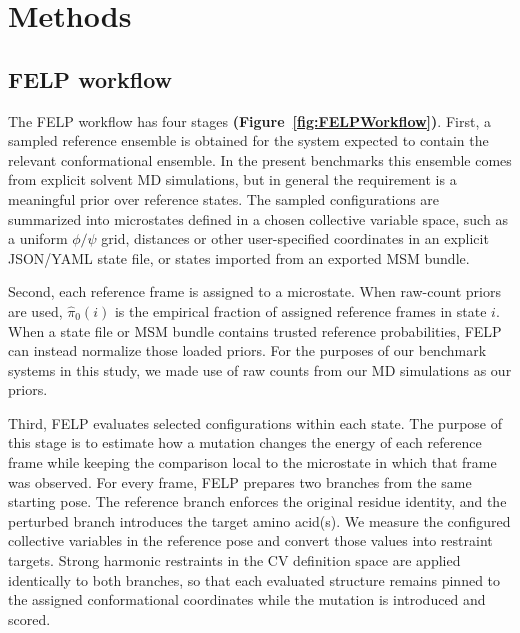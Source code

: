 \documentclass[journal=jctcce,manuscript=article,layout=twocolumn,hyperref=true]{achemso}
\newcommand{\figrefp}[2][]{\textbf{(Figure~\ref{#2}#1)}}
\begin{document}
	\section{Methods}
	
	\subsection{FELP workflow}
	
	The FELP workflow has four stages \figrefp{fig:FELPWorkflow}. First, a sampled reference ensemble is obtained for the system expected to contain the relevant conformational ensemble. In the present benchmarks this ensemble comes from explicit solvent MD simulations, but in general the requirement is a meaningful prior over reference states. The sampled configurations are summarized into microstates defined in a chosen collective variable space, such as a uniform $\phi/\psi$ grid, distances or other user-specified coordinates in an explicit JSON/YAML state file, or states imported from an exported MSM bundle.
	
	Second, each reference frame is assigned to a microstate. When raw-count priors are used, $\hat{\pi}_0(i)$ is the empirical fraction of assigned reference frames in state $i$. When a state file or MSM bundle contains trusted reference probabilities, FELP can instead normalize those loaded priors. For the purposes of our benchmark systems in this study, we made use of raw counts from our MD simulations as our priors.
	
	Third, FELP evaluates selected configurations within each state. The purpose of this stage is to estimate how a mutation changes the energy of each reference frame while keeping the comparison local to the microstate in which that frame was observed. For every frame, FELP prepares two branches from the same starting pose. The reference branch enforces the original residue identity, and the perturbed branch introduces the target amino acid(s). We measure the configured collective variables in the reference pose and convert those values into restraint targets. Strong harmonic restraints in the CV definition space are applied identically to both branches, so that each evaluated structure remains pinned to the assigned conformational coordinates while the mutation is introduced and scored.
	
\end{document}
